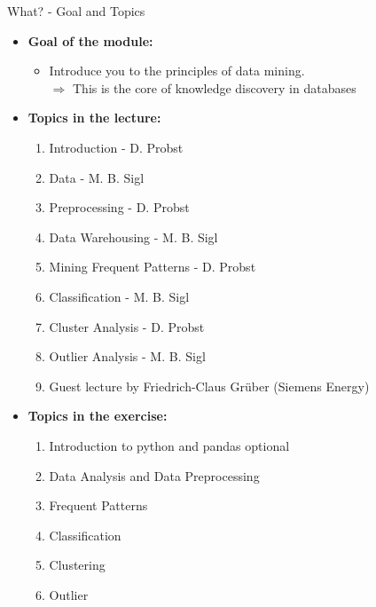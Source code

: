 \begin{frame}{What? - Goal and Topics}
	\begin{itemize}
		\item \textbf{Goal of the module:}
		      \begin{itemize}
			      \item Introduce you to the principles of data mining. \\
			            $\Rightarrow$ This is the core of knowledge discovery in databases
		      \end{itemize}
		\item \textbf{Topics in the lecture:}
		      \vspace*{-1\multicolsep}
		      \begin{multicols}{2}
			      \begin{enumerate}
				      \item Introduction {\color{gray} - D. Probst}
				      \item Data {\color{gray} - M. B. Sigl}
				      \item Preprocessing {\color{gray} - D. Probst}
				      \item Data Warehousing {\color{gray} - M. B. Sigl}
				      \item Mining Frequent Patterns {\color{gray} - D. Probst}
				      \item Classification {\color{gray} - M. B. Sigl}
				      \item Cluster Analysis {\color{gray} - D. Probst}
				      \item Outlier Analysis {\color{gray} - M. B. Sigl}
				      \item {\color{gray}Guest lecture by Friedrich-Claus Grüber (Siemens Energy)}
			      \end{enumerate}
		      \end{multicols}
		      \vspace*{-1\multicolsep}
		\item \textbf{Topics in the exercise:}
		      \vspace*{-1\multicolsep}
		      \begin{multicols}{2}
			      \begin{enumerate}
				      \item Introduction to python and pandas {\color{gray}optional}
				      \item Data Analysis and Data Preprocessing
				      \item Frequent Patterns
				      \item Classification
				      \item Clustering
				      \item Outlier
			      \end{enumerate}
		      \end{multicols}
		      \
	\end{itemize}
\end{frame}

